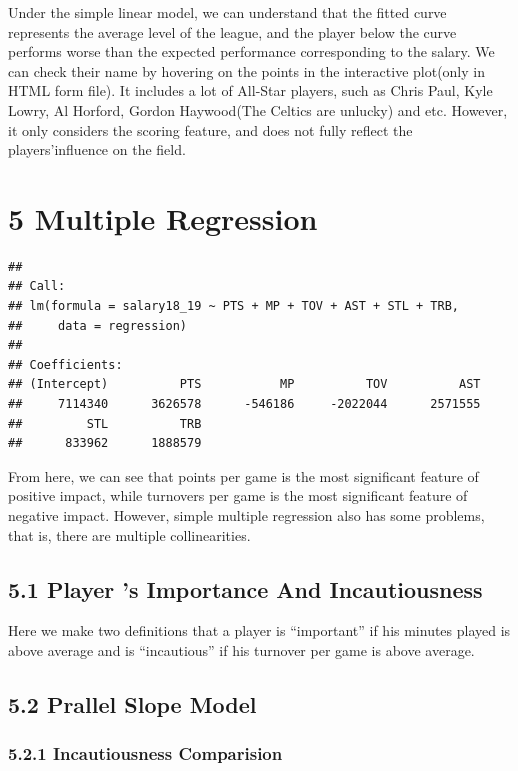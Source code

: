 \documentclass[]{article}
\begin{document}
Under the simple linear model, we can understand that the fitted curve
represents the average level of the league, and the player below the
curve performs worse than the expected performance corresponding to the
salary. We can check their name by hovering on the points in the
interactive plot(only in HTML form file). It includes a lot of All-Star
players, such as Chris Paul, Kyle Lowry, Al Horford, Gordon Haywood(The
Celtics are unlucky) and etc. However, it only considers the scoring
feature, and does not fully reflect the players'influence on the field.

\section{5 Multiple Regression}\label{multiple-regression}

\begin{verbatim}
## 
## Call:
## lm(formula = salary18_19 ~ PTS + MP + TOV + AST + STL + TRB, 
##     data = regression)
## 
## Coefficients:
## (Intercept)          PTS           MP          TOV          AST  
##     7114340      3626578      -546186     -2022044      2571555  
##         STL          TRB  
##      833962      1888579
\end{verbatim}

From here, we can see that points per game is the most significant
feature of positive impact, while turnovers per game is the most
significant feature of negative impact. However, simple multiple
regression also has some problems, that is, there are multiple
collinearities.

\subsection{5.1 Player 's Importance And
Incautiousness}\label{player-s-importance-and-incautiousness}

Here we make two definitions that a player is ``important'' if his
minutes played is above average and is ``incautious'' if his turnover
per game is above average.

\subsection{5.2 Prallel Slope Model}\label{prallel-slope-model}

\subsubsection{5.2.1 Incautiousness
Comparision}\label{incautiousness-comparision}
\end{document}
